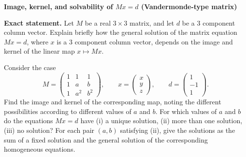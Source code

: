 \begin{problem}[CP-I-0063]
\label{prob:cp-i-0063}
\textbf{Image, kernel, and solvability of \(Mx=d\) (Vandermonde-type matrix)}

\textbf{Exact statement.}
\hspace*{1.5em}Let \(M\) be a real \(3\times 3\) matrix, and let \(d\) be a 3 component column vector. Explain briefly how the
general solution of the matrix equation \(Mx=d\), where \(x\) is a 3 component column vector, depends on
the image and kernel of the linear map \(x\mapsto Mx\).

Consider the case
\[
M=\begin{pmatrix}
	1&1&1\\
	1&a&b\\
	1&a^2&b^2
\end{pmatrix},\qquad
x=\begin{pmatrix}x\\y\\z\end{pmatrix},\qquad
d=\begin{pmatrix}1\\-1\\1\end{pmatrix}.
\]
Find the image and kernel of the corresponding map, noting the different possibilities according to different values of \(a\) and \(b\).
For which values of \(a\) and \(b\) do the equations \(Mx=d\) have (i) a unique solution, (ii) more than one solution, (iii) no solution?
For each pair \((a,b)\) satisfying (ii), give the solutions as the sum of a fixed solution and the general solution of the corresponding homogeneous equations.

\end{problem}

